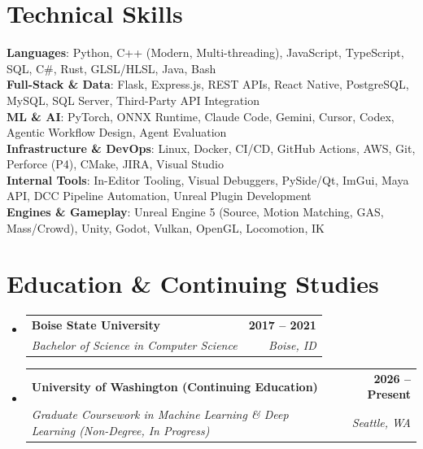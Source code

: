 \documentclass[letterpaper,11pt]{article}
\makeatletter
\newcommand{\resumeSubheading}[4]{
  \vspace{-2pt}\item
    \begin{tabular*}{1.0\textwidth}[t]{l@{\extracolsep{\fill}}r}
      \textbf{#1} & \textbf{\small #2} \\
      \textit{\small#3} & \textit{\small #4} \\
    \end{tabular*}\vspace{-7pt}
}
\newcommand{\resumeSubHeadingListStart}{\begin{itemize}[leftmargin=0.0in, label={}]}
\newcommand{\resumeSubHeadingListEnd}{\end{itemize}}
\makeatother
\begin{document}
\section{Technical Skills}
 \begin{itemize}[leftmargin=0.15in, label={}]
    \small{\item{
     \textbf{Languages}{: Python, C++ (Modern, Multi-threading), JavaScript, TypeScript, SQL, C\#, Rust, GLSL/HLSL, Java, Bash} \\
     \textbf{Full-Stack \& Data}{: Flask, Express.js, REST APIs, React Native, PostgreSQL, MySQL, SQL Server, Third-Party API Integration} \\
     \textbf{ML \& AI}{: PyTorch, ONNX Runtime, Claude Code, Gemini, Cursor, Codex, Agentic Workflow Design, Agent Evaluation} \\
     \textbf{Infrastructure \& DevOps}{: Linux, Docker, CI/CD, GitHub Actions, AWS, Git, Perforce (P4), CMake, JIRA, Visual Studio} \\
     \textbf{Internal Tools}{: In-Editor Tooling, Visual Debuggers, PySide/Qt, ImGui, Maya API, DCC Pipeline Automation, Unreal Plugin Development} \\
     \textbf{Engines \& Gameplay}{: Unreal Engine 5 (Source, Motion Matching, GAS, Mass/Crowd), Unity, Godot, Vulkan, OpenGL, Locomotion, IK}
    }}
 \end{itemize}
 \vspace{-12pt}

\section{Education \& Continuing Studies}
  \resumeSubHeadingListStart
    \resumeSubheading
      {Boise State University}{2017 -- 2021}
      {Bachelor of Science in Computer Science}{Boise, ID}
    \resumeSubheading
      {University of Washington (Continuing Education)}{2026 -- Present}
      {Graduate Coursework in Machine Learning \& Deep Learning (Non-Degree, In Progress)}{Seattle, WA}
  \resumeSubHeadingListEnd
\end{document}
